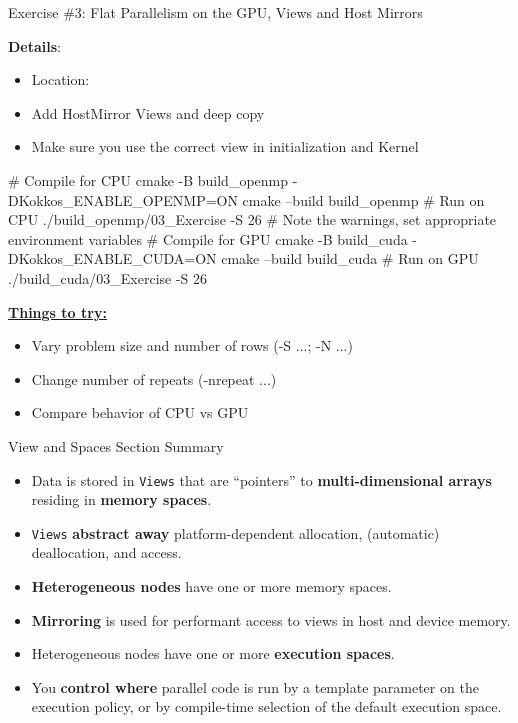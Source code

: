 \begin{frame}[fragile]{Exercise \#3: Flat Parallelism on the GPU, Views and Host Mirrors}

  \textbf{Details}:
  \begin{scriptsize}
  \begin{itemize}
\item Location: 
\item Add HostMirror Views and deep copy
\item Make sure you use the correct view in initialization and Kernel
\end{itemize}
  \end{scriptsize}

\begin{code}
  # Compile for CPU
  cmake -B build_openmp -DKokkos_ENABLE_OPENMP=ON
  cmake --build build_openmp
  # Run on CPU
  ./build_openmp/03_Exercise -S 26
  # Note the warnings, set appropriate environment variables
  # Compile for GPU
  cmake -B build_cuda -DKokkos_ENABLE_CUDA=ON
  cmake --build build_cuda
  # Run on GPU
  ./build_cuda/03_Exercise -S 26
\end{code}

  \ul{\textbf{Things to try:}}
  \begin{scriptsize}
  \begin{itemize}
  \item Vary problem size and number of rows (-S ...; -N ...)
  \item Change number of repeats (-nrepeat ...)
  \item Compare behavior of CPU vs GPU
  \end{itemize}
  \end{scriptsize}



\end{frame}


\begin{frame}[fragile]{View and Spaces Section Summary}

  \begin{itemize}
    \item{Data is stored in \texttt{Views} that are ``pointers'' to \textbf{multi-dimensional arrays} residing in \textbf{memory spaces}.}
    \item{\texttt{Views} \textbf{abstract away} platform-dependent allocation, (automatic) deallocation, and access.}
    \item{\textbf{Heterogeneous nodes} have one or more memory spaces.}
    \item{\textbf{Mirroring} is used for performant access to views in host and device memory.}
    \item{Heterogeneous nodes have one or more \textbf{execution spaces}.}
    \item{You \textbf{control where} parallel code is run by a template parameter on the execution policy, or by compile-time selection of the default execution space.}
  \end{itemize}

\end{frame}
